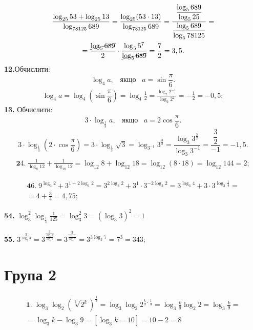 \begin{multline*}
\dfrac{\log_{25}53+\log_{25}13}{\log_{78125}{689}}=
\dfrac{\log_{25}(53\cdot13)}{\log_{78125}689}=
\dfrac{\dfrac{\log_{5}689}{\log_{5}25}}{\dfrac{\log_{5}689}{\log_{5}78125}}=\\
=\dfrac{\cancel{\log_{5}689}}{2}\cdot\dfrac{\log_{5}5^7}{\cancel{\log_{5}689}}=
\dfrac{7}{2}=3,5.
\end{multline*}
\textbf{12.}Обчислити:
$$
\log_4 a, \;\;\; \mbox{якщо} \;\;\; a=\sin\dfrac{\pi}{6}.
$$
\begin{gather*}
\log_{4}a=
\log_{4}\left(\sin\dfrac{\pi}{6}\right)=
\log_4 \frac{1}{2} =
\frac{\log_2 2^{-1}}{\log_2 2^2}=
-\frac{1}{2} = -0,5;
\end{gather*}
\textbf{13.} Обчислити:
$$
3\cdot\log_{\frac{1}{3}}a, \;\;\; \mbox{якщо} \;\;\; a=2\cos\dfrac{\pi}{6}.
$$
\begin{gather*}
3\cdot\log_{\frac{1}{3}}\left(2\cdot\cos\dfrac{\pi}{6}\right)=
3\cdot\log_{\frac{1}{3}}\sqrt{3}=
\log_{3^{-1}}3^{\frac{3}{2}}=
\dfrac{\log_{3}3^{\frac{3}{2}}}{\log_{3}3^{-1}}=
\dfrac{\dfrac{3}{2}}{-1}=-1,5.
\end{gather*}
\begin{multline*}
{\mathbf 24.}\;
\frac{1}{\log_8 12} + \frac{1}{\log_{18} 12} =
\log_{12} 8 + \log_{12} 18 =
\log_{12} (8 \cdot 18) =
\log_{12} 144 = 2;
\end{multline*}

\begin{multline*}
{\mathbf 46.}\;
9^{\log_3 2} + 3^{1 - 2\log_3 2} =
3^{2\log_3 2} + 3^1 \cdot 3^{-2\log_3 2} =
3^{\log_3 4} + 3 \cdot 3^{\log_3 \frac{1}{4}} =\\
= 4 + \frac{3}{4} = 4,75;
\end{multline*}

\textbf{54.} $\log^2_3 \log_{\frac{1}{5}} \frac{1}{125} = \log^2_3 3 = \left(\log_3 3\right)^2 = 1$

\textbf{55.} $3^{\frac{3}{\log_7 3}} = 3^{\frac{3}{\frac{\log_3 3}{\log_3 7}}} = 3^{\frac{3}{\frac{1}{\log_3 7}}} = 3^{3\log_3 7} = 7^3 = 343;$
\section*{Група 2}

\begin{multline*}
{\mathbf 1.}\;
\log_3\log_2 \left(\sqrt[3]{2^k}\right)^{\frac{1}{3}} =
\log_3 \log_2 2^{\frac{k}{3} \cdot \frac{1}{3}} =
\log_3 \frac{k}{9} \log_2 2 =
\log_3 \frac{k}{9} =\\
= \log_3 k - \log_3 9 = 
\left[\log_3 k = 10\right] = 
10 - 2 = 8
\end{multline*}

